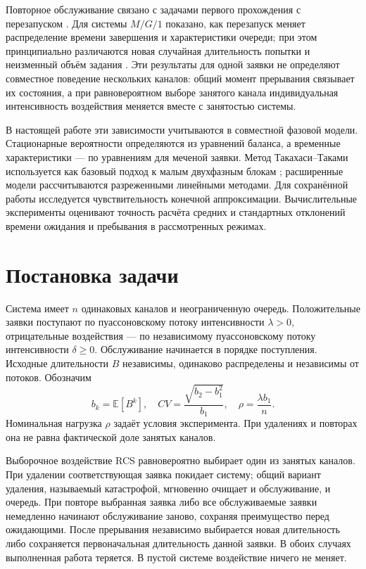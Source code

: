 Повторное обслуживание связано с задачами первого прохождения с перезапуском \cite{pal2017}. Для системы \(M/G/1\) показано, как перезапуск меняет распределение времени завершения и характеристики очереди; при этом принципиально различаются новая случайная длительность попытки и неизменный объём задания \cite{bonomo2022}. Эти результаты для одной заявки не определяют совместное поведение нескольких каналов: общий момент прерывания связывает их состояния, а при равновероятном выборе занятого канала индивидуальная интенсивность воздействия меняется вместе с занятостью системы.

В настоящей работе эти зависимости учитываются в совместной фазовой модели. Стационарные вероятности определяются из уравнений баланса, а временные характеристики --- по уравнениям для меченой заявки. Метод Такахаси--Таками используется как базовый подход к малым двухфазным блокам \cite{takahashi1976,ryzhikov2018ru}; расширенные модели рассчитываются разреженными линейными методами. Для сохранённой работы исследуется чувствительность конечной аппроксимации. Вычислительные эксперименты оценивают точность расчёта средних и стандартных отклонений времени ожидания и пребывания в рассмотренных режимах.

\section{Постановка задачи}
Система имеет \(n\) одинаковых каналов и неограниченную очередь. Положительные заявки поступают по пуассоновскому потоку интенсивности \(\lambda>0\), отрицательные воздействия --- по независимому пуассоновскому потоку интенсивности \(\delta\ge0\). Обслуживание начинается в порядке поступления. Исходные длительности \(B\) независимы, одинаково распределены и независимы от потоков. Обозначим
\[
b_k=\mathbb E[B^k],\quad CV=\frac{\sqrt{b_2-b_1^2}}{b_1},\quad \rho=\frac{\lambda b_1}{n}.
\]
Номинальная нагрузка \(\rho\) задаёт условия эксперимента. При удалениях и повторах она не равна фактической доле занятых каналов.

Выборочное воздействие RCS равновероятно выбирает один из занятых каналов. При удалении соответствующая заявка покидает систему; общий вариант удаления, называемый катастрофой, мгновенно очищает и обслуживание, и очередь. При повторе выбранная заявка либо все обслуживаемые заявки немедленно начинают обслуживание заново, сохраняя преимущество перед ожидающими. После прерывания независимо выбирается новая длительность либо сохраняется первоначальная длительность данной заявки. В обоих случаях выполненная работа теряется. В пустой системе воздействие ничего не меняет.

